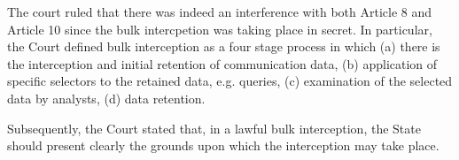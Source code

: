 The court ruled that there was indeed an interference with both Article 8 and Article 10 since the bulk intercpetion was taking place in secret. In particular, the Court defined bulk interception as a four stage process in which (a) there is the interception and initial retention of communication data, (b) application of specific selectors to the retained data, e.g. queries, (c) examination of the selected data by analysts, (d) data retention. 

Subsequently, the Court stated that, in a lawful bulk interception, the State should present clearly the grounds upon which the interception may take place.


